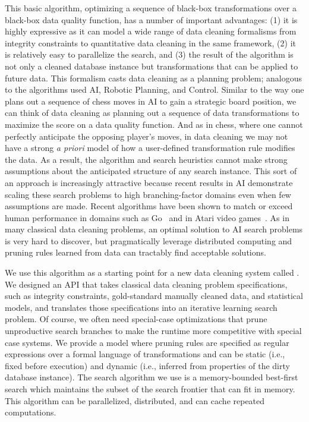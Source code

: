 This basic algorithm, optimizing a sequence of black-box transformations over a black-box data quality function, has a number of important advantages: (1) it is highly expressive as it can model a wide range of data cleaning formalisms from integrity constraints to quantitative data cleaning in the same framework, (2) it is relatively easy to parallelize the search, and (3) the result of the algorithm is not only a cleaned database instance but transformations that can be applied to future data.
This formalism casts data cleaning as a planning problem; analogous to the algorithms used AI, Robotic Planning, and Control.
Similar to the way one plans out a sequence of chess moves in AI to gain a strategic board position, we can think of data cleaning as planning out a sequence of data transformations to maximize the score on a data quality function.
And as in chess, where one cannot perfectly anticipate the opposing player's moves, in data cleaning we may not have a strong \emph{a priori} model of how a user-defined transformation rule modifies the data.
As a result, the algorithm and search heuristics cannot make strong assumptions about the anticipated structure of any search instance.
This sort of an approach is increasingly attractive because recent results in AI demonstrate scaling these search problems to  high branching-factor domains even when few assumptions are made.
Recent algorithms have been shown to match or exceed human performance in domains such as Go~\cite{silver2016mastering} and in Atari video games~\cite{mnih2015human}.
As in many classical data cleaning problems, an optimal solution to AI search problems is very hard to discover, but pragmatically leverage distributed computing and pruning rules learned from data can tractably find acceptable solutions.

We use this algorithm as a starting point for a new data cleaning system called \sys.
We designed an API that takes classical data cleaning problem specifications, such as integrity constraints, gold-standard manually cleaned data, and statistical models, and translates those specifications into an iterative learning search problem. 
Of course, we often need special-case optimizations that prune unproductive search branches to make the runtime more competitive with special case systems.
We provide a model where pruning rules are specified as regular expressions over a formal language of transformations and can be static (i.e., fixed before execution) and dynamic (i.e., inferred from properties of the dirty database instance).
The search algorithm we use is a memory-bounded best-first search which maintains the subset of the search frontier that can fit in memory. 
This algorithm can be parallelized, distributed, and can cache repeated computations.
\fi



